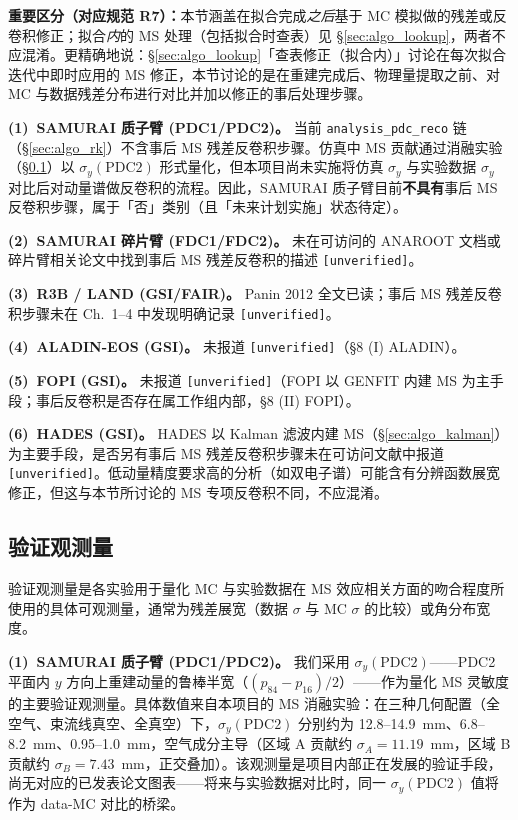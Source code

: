 \documentclass[a4paper, 11pt]{article}
\begin{document}
\textbf{重要区分（对应规范 R7）：}本节涵盖在拟合完成\emph{之后}基于 MC 模拟做的残差或反卷积修正；拟合\emph{内}的 MS 处理（包括拟合时查表）见 §\ref{sec:algo_lookup}，两者不应混淆。更精确地说：§\ref{sec:algo_lookup}「查表修正（拟合内）」讨论在每次拟合迭代中即时应用的 MS 修正，本节讨论的是在重建完成后、物理量提取之前、对 MC 与数据残差分布进行对比并加以修正的事后处理步骤。

\textbf{(1)~SAMURAI 质子臂 (PDC1/PDC2)。}
当前 \texttt{analysis\_pdc\_reco} 链（§\ref{sec:algo_rk}）不含事后 MS 残差反卷积步骤。仿真中 MS 贡献通过消融实验（§\ref{sec:validation_obs}）以 $\sigma_y(\text{PDC2})$ 形式量化，但本项目尚未实施将仿真 $\sigma_y$ 与实验数据 $\sigma_y$ 对比后对动量谱做反卷积的流程。因此，SAMURAI 质子臂目前\textbf{不具有}事后 MS 反卷积步骤，属于「否」类别（且「未来计划实施」状态待定）。

\textbf{(2)~SAMURAI 碎片臂 (FDC1/FDC2)。}
未在可访问的 ANAROOT 文档或碎片臂相关论文中找到事后 MS 残差反卷积的描述 \texttt{[unverified]}。

\textbf{(3)~R3B / LAND (GSI/FAIR)。}
Panin 2012 全文已读；事后 MS 残差反卷积步骤未在 Ch.~1--4 中发现明确记录 \texttt{[unverified]}。

\textbf{(4)~ALADIN-EOS (GSI)。}
未报道 \texttt{[unverified]}（§8 (I) ALADIN）。

\textbf{(5)~FOPI (GSI)。}
未报道 \texttt{[unverified]}（FOPI 以 GENFIT 内建 MS 为主手段；事后反卷积是否存在属工作组内部，§8 (II) FOPI）。

\textbf{(6)~HADES (GSI)。}
HADES 以 Kalman 滤波内建 MS（§\ref{sec:algo_kalman}）为主要手段，是否另有事后 MS 残差反卷积步骤未在可访问文献中报道 \texttt{[unverified]}。低动量精度要求高的分析（如双电子谱）可能含有分辨函数展宽修正，但这与本节所讨论的 MS 专项反卷积不同，不应混淆。

\subsection{验证观测量}
\label{sec:validation_obs}

验证观测量是各实验用于量化 MC 与实验数据在 MS 效应相关方面的吻合程度所使用的具体可观测量，通常为残差展宽（数据 $\sigma$ 与 MC $\sigma$ 的比较）或角分布宽度。

\textbf{(1)~SAMURAI 质子臂 (PDC1/PDC2)。}
我们采用 $\sigma_y(\text{PDC2})$——PDC2 平面内 $y$ 方向上重建动量的鲁棒半宽（$(p_{84}-p_{16})/2$）——作为量化 MS 灵敏度的主要验证观测量。具体数值来自本项目的 MS 消融实验：在三种几何配置（全空气、束流线真空、全真空）下，$\sigma_y(\text{PDC2})$ 分别约为 12.8--14.9~mm、6.8--8.2~mm、0.95--1.0~mm，空气成分主导（区域 A 贡献约 $\sigma_A = 11.19$~mm，区域 B 贡献约 $\sigma_B = 7.43$~mm，正交叠加）。该观测量是项目内部正在发展的验证手段，尚无对应的已发表论文图表——将来与实验数据对比时，同一 $\sigma_y(\text{PDC2})$ 值将作为 data-MC 对比的桥梁。
\end{document}
